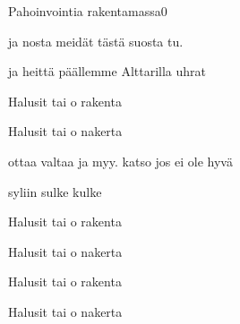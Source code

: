 \documentclass[12pt,a4paper]{article}
\begin{document}
\thispagestyle{empty}
\begin{mysong}{Pahoinvointia rakentamassa}{0}

\begin{SBVerse}
   ja nosta meidät  tästä suosta 
  tu.

   ja heittä päällemme  Alttarilla
   uhrat
\end{SBVerse}

\begin{SBChorus}
  Halusit tai  o 
  rakenta
  
  Halusit tai  o 
  nakerta
\end{SBChorus}

\begin{SBVerse}
   ottaa valtaa ja  myy.  katso
   jos ei ole hyvä 

   syliin sulke 
   kulke
\end{SBVerse}

\begin{SBChorus}
  Halusit tai  o 
  rakenta
  
  Halusit tai  o 
  nakerta

  Halusit tai  o 
  rakenta
  
  Halusit tai  o 
  nakerta
\end{SBChorus}

\end{mysong}
\end{document}

